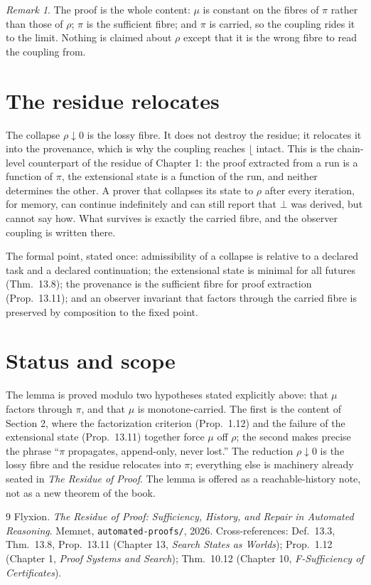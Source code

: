 \documentclass[10pt,a4paper]{article}
\theoremstyle{plain}
\theoremstyle{definition}
\theoremstyle{remark}
\newtheorem{remark}{Remark}
\newcommand{\home}{\lfloor}
\newcommand{\Rho}{\rho}
\newcommand{\Pii}{\pi}
\newcommand{\Mu}{\mu}
\begin{document}
\begin{remark}
The proof is the whole content: $\Mu$ is constant on the fibres of $\Pii$ rather
than those of $\Rho$; $\Pii$ is the sufficient fibre; and $\Pii$ is carried, so
the coupling rides it to the limit. Nothing is claimed about $\Rho$ except that
it is the wrong fibre to read the coupling from.
\end{remark}

\section{The residue relocates}

The collapse $\Rho \downarrow 0$ is the lossy fibre. It does not destroy the
residue; it relocates it into the provenance, which is why the coupling reaches
$\home$ intact. This is the chain-level counterpart of the residue of
Chapter 1: the proof extracted from a run is a function of $\Pii$, the
extensional state is a function of the run, and neither determines the other.
A prover that collapses its state to $\Rho$ after every iteration, for memory,
can continue indefinitely and can still report that $\bot$ was derived, but
cannot say how. What survives is exactly the carried fibre, and the observer
coupling is written there.

The formal point, stated once: admissibility of a collapse is relative to a
declared task and a declared continuation; the extensional state is minimal for
all futures (Thm.~13.8); the provenance is the sufficient fibre for proof
extraction (Prop.~13.11); and an observer invariant that factors through the
carried fibre is preserved by composition to the fixed point.

\section*{Status and scope}

The lemma is proved modulo two hypotheses stated explicitly above: that $\Mu$
factors through $\Pii$, and that $\Mu$ is monotone-carried. The first is the
content of Section 2, where the factorization criterion (Prop.~1.12) and the
failure of the extensional state (Prop.~13.11) together force $\Mu$ off $\Rho$;
the second makes precise the phrase ``$\Pii$ propagates, append-only, never
lost.'' The reduction $\Rho \downarrow 0$ is the lossy fibre and the residue
relocates into $\Pii$; everything else is machinery already seated in
\emph{The Residue of Proof}. The lemma is offered as a reachable-history note,
not as a new theorem of the book.

\begin{thebibliography}{9}
Flyxion. \emph{The Residue of Proof: Sufficiency, History, and Repair in
Automated Reasoning}. Memnet, \texttt{automated-proofs/}, 2026.
Cross-references: Def.~13.3, Thm.~13.8, Prop.~13.11 (Chapter 13, \emph{Search
States as Worlds}); Prop.~1.12 (Chapter 1, \emph{Proof Systems and Search});
Thm.~10.12 (Chapter 10, \emph{F-Sufficiency of Certificates}).
\end{thebibliography}
\end{document}
